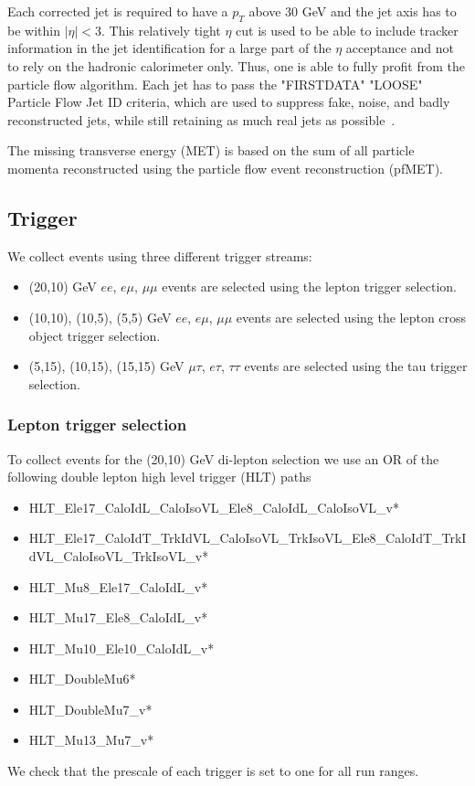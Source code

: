 Each corrected jet is required to have a $p_T$ above 30 GeV and 
the jet axis has to be within $|\eta| < 3$. This relatively tight $\eta$ cut is used 
to be able to include tracker information in the jet identification for a large part of the $\eta$ acceptance and 
not to rely on the hadronic calorimeter only. 
Thus, one is able to fully profit from the particle flow algorithm.
Each jet has to pass the "FIRSTDATA" "LOOSE" Particle Flow Jet ID criteria, which
are used to suppress fake, noise, and badly reconstructed jets, while
still retaining as much real jets as possible~\cite{pfjetid}.

The missing transverse energy (MET) is based on the sum of all particle 
momenta reconstructed using the particle flow event reconstruction (pfMET).

\subsection{Trigger}\label{sec:trigger}

We collect events using three different trigger streams:
\begin{itemize}
\item (20,10) GeV $ee$, $e\mu$, $\mu\mu$ events are selected using the lepton trigger selection.
\item (10,10), (10,5), (5,5) GeV $ee$, $e\mu$, $\mu\mu$ events are selected using the lepton \HT cross object trigger selection.
\item (5,15), (10,15), (15,15) GeV $\mu\tau$, $e\tau$, $\tau\tau$ events are selected using the tau trigger selection.
\end{itemize}

\subsubsection{Lepton trigger selection}
To collect events for the (20,10) GeV di-lepton selection
we use an OR of the following double lepton high level trigger (HLT) paths
\begin{itemize}
\item HLT\_Ele17\_CaloIdL\_CaloIsoVL\_Ele8\_CaloIdL\_CaloIsoVL\_v* 
\item HLT\_Ele17\_CaloIdT\_TrkIdVL\_CaloIsoVL\_TrkIsoVL\_Ele8\_CaloIdT\_TrkIdVL\_CaloIsoVL\_TrkIsoVL\_v* 
\item HLT\_Mu8\_Ele17\_CaloIdL\_v* 
\item HLT\_Mu17\_Ele8\_CaloIdL\_v* 
\item HLT\_Mu10\_Ele10\_CaloIdL\_v* 
\item HLT\_DoubleMu6* 
\item HLT\_DoubleMu7\_v* 
\item HLT\_Mu13\_Mu7\_v*
\end{itemize}
We check that the prescale of each trigger is set to one
for all run ranges.

